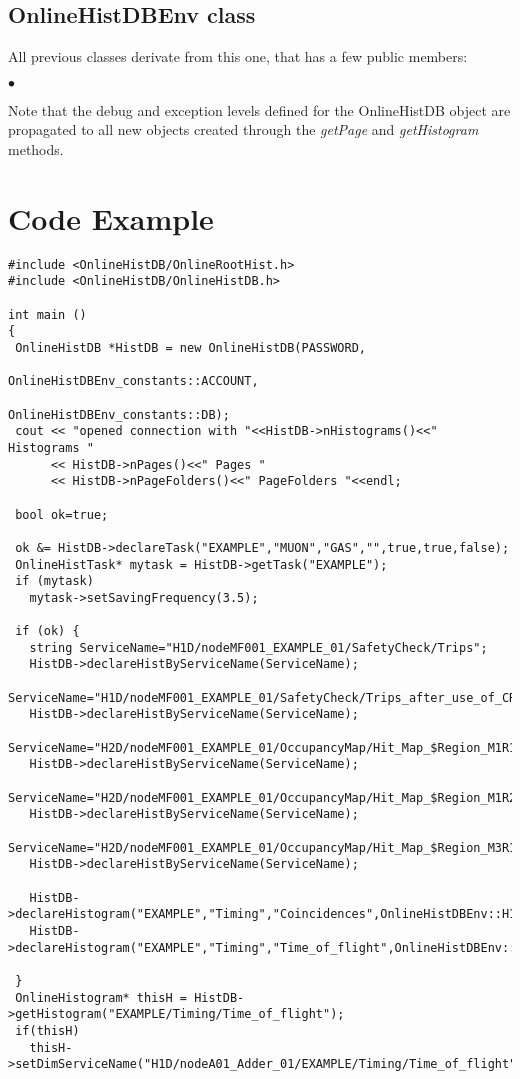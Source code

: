 \documentclass{lhcbnote}
\begin{document}
\subsection{OnlineHistDBEnv class}\label{dbenvclass}
All previous classes derivate from this one, that has a few public
members:
\begin{list}{$\bullet$}{}

\end{list}

Note that the debug and exception levels defined for the OnlineHistDB object are
propagated to all new objects created through the {\it getPage} and
{\it getHistogram} methods.



\section{Code Example}

\begin{verbatim}
#include <OnlineHistDB/OnlineRootHist.h>
#include <OnlineHistDB/OnlineHistDB.h>

int main ()
{
 OnlineHistDB *HistDB = new OnlineHistDB(PASSWORD,
                                        OnlineHistDBEnv_constants::ACCOUNT,
                                        OnlineHistDBEnv_constants::DB);
 cout << "opened connection with "<<HistDB->nHistograms()<<" Histograms "
      << HistDB->nPages()<<" Pages "
      << HistDB->nPageFolders()<<" PageFolders "<<endl;
    
 bool ok=true;
  
 ok &= HistDB->declareTask("EXAMPLE","MUON","GAS","",true,true,false);
 OnlineHistTask* mytask = HistDB->getTask("EXAMPLE");
 if (mytask)
   mytask->setSavingFrequency(3.5);
  
 if (ok) {
   string ServiceName="H1D/nodeMF001_EXAMPLE_01/SafetyCheck/Trips";
   HistDB->declareHistByServiceName(ServiceName);
   ServiceName="H1D/nodeMF001_EXAMPLE_01/SafetyCheck/Trips_after_use_of_CRack";
   HistDB->declareHistByServiceName(ServiceName);
   ServiceName="H2D/nodeMF001_EXAMPLE_01/OccupancyMap/Hit_Map_$Region_M1R1";
   HistDB->declareHistByServiceName(ServiceName); 
   ServiceName="H2D/nodeMF001_EXAMPLE_01/OccupancyMap/Hit_Map_$Region_M1R2";
   HistDB->declareHistByServiceName(ServiceName);
   ServiceName="H2D/nodeMF001_EXAMPLE_01/OccupancyMap/Hit_Map_$Region_M3R1";
   HistDB->declareHistByServiceName(ServiceName);
   
   HistDB->declareHistogram("EXAMPLE","Timing","Coincidences",OnlineHistDBEnv::H1D);
   HistDB->declareHistogram("EXAMPLE","Timing","Time_of_flight",OnlineHistDBEnv::H1D);
   
 }
 OnlineHistogram* thisH = HistDB->getHistogram("EXAMPLE/Timing/Time_of_flight");
 if(thisH)
   thisH->setDimServiceName("H1D/nodeA01_Adder_01/EXAMPLE/Timing/Time_of_flight");
\end{verbatim}
\end{document}
